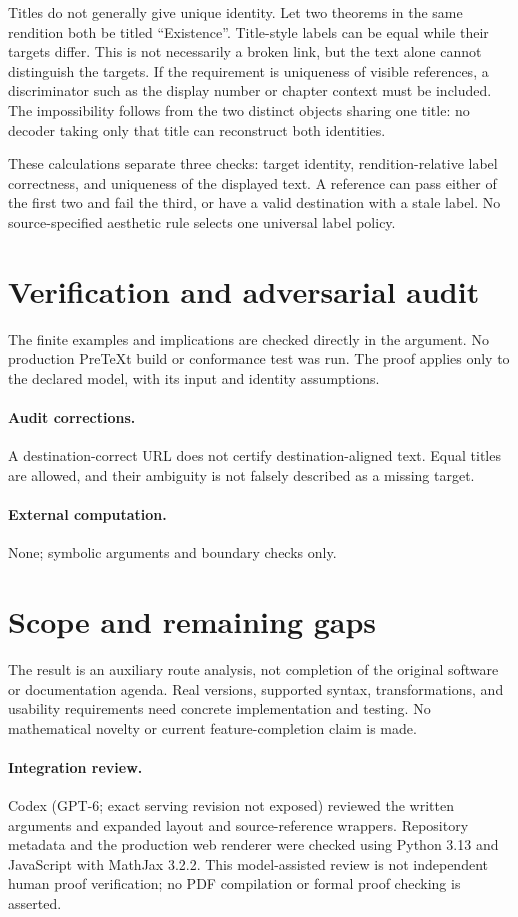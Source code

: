 \documentclass[11pt]{article}
\begin{document}
Titles do not generally give unique identity. Let two theorems in the same rendition both be titled ``Existence''. Title-style labels can be equal while their targets differ. This is not necessarily a broken link, but the text alone cannot distinguish the targets. If the requirement is uniqueness of visible references, a discriminator such as the display number or chapter context must be included. The impossibility follows from the two distinct objects sharing one title: no decoder taking only that title can reconstruct both identities.

These calculations separate three checks: target identity, rendition-relative label correctness, and uniqueness of the displayed text. A reference can pass either of the first two and fail the third, or have a valid destination with a stale label. No source-specified aesthetic rule selects one universal label policy.
\section{Verification and adversarial audit}
The finite examples and implications are checked directly in the argument. No production PreTeXt build or conformance test was run. The proof applies only to the declared model, with its input and identity assumptions.
\paragraph{Audit corrections.} A destination-correct URL does not certify destination-aligned text. Equal titles are allowed, and their ambiguity is not falsely described as a missing target.
\paragraph{External computation.} None; symbolic arguments and boundary checks only.
\section{Scope and remaining gaps}
The result is an auxiliary route analysis, not completion of the original software or documentation agenda. Real versions, supported syntax, transformations, and usability requirements need concrete implementation and testing. No mathematical novelty or current feature-completion claim is made.
\paragraph{Integration review.} Codex (GPT-6; exact serving revision not exposed) reviewed the written arguments and expanded layout and source-reference wrappers. Repository metadata and the production web renderer were checked using Python 3.13 and JavaScript with MathJax 3.2.2. This model-assisted review is not independent human proof verification; no PDF compilation or formal proof checking is asserted.
\end{document}
